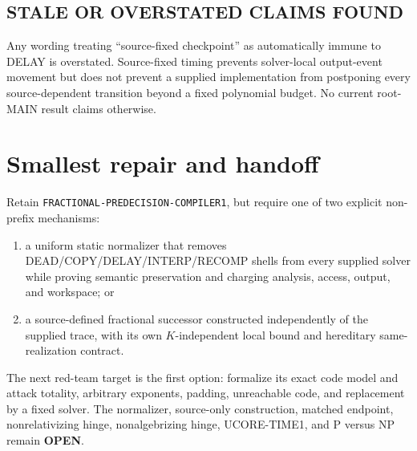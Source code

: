\documentclass[11pt]{article}
\newcommand{\OPEN}{\textbf{OPEN}}
\begin{document}
\subsection*{STALE OR OVERSTATED CLAIMS FOUND}
Any wording treating ``source-fixed checkpoint'' as automatically immune to
DELAY is overstated.  Source-fixed timing prevents solver-local output-event
movement but does not prevent a supplied implementation from postponing every
source-dependent transition beyond a fixed polynomial budget.  No current
root-MAIN result claims otherwise.

\section{Smallest repair and handoff}

Retain \texttt{FRACTIONAL-PREDECISION-COMPILER1}, but require one of two
explicit non-prefix mechanisms:
\begin{enumerate}[label=(\alph*)]
\item a uniform static normalizer that removes DEAD/COPY/DELAY/INTERP/RECOMP
shells from every supplied solver while proving semantic preservation and
charging analysis, access, output, and workspace; or
\item a source-defined fractional successor constructed independently of the
supplied trace, with its own $K$-independent local bound and hereditary
same-realization contract.
\end{enumerate}
The next red-team target is the first option: formalize its exact code model
and attack totality, arbitrary exponents, padding, unreachable code, and
replacement by a fixed solver.  The normalizer, source-only construction,
matched endpoint, nonrelativizing hinge, nonalgebrizing hinge, UCORE-TIME1,
and P versus NP remain \OPEN.
\end{document}
